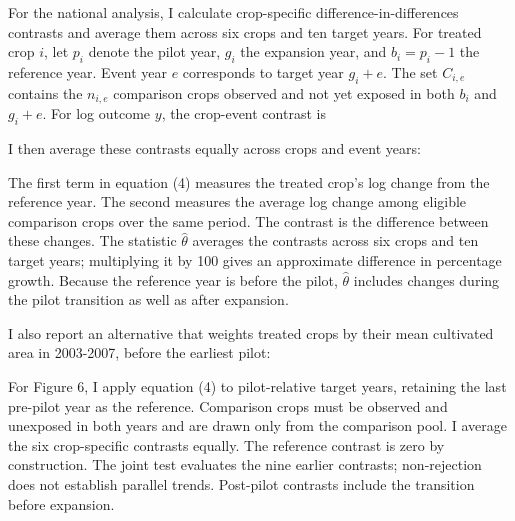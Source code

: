 
For the national analysis, I calculate crop-specific difference-in-differences contrasts and average them across six crops and ten target years. For treated crop \(i\), let \(p_{i}\) denote the pilot year, \(g_{i}\) the expansion year, and \(b_{i} = p_{i} - 1\) the reference year. Event year \(e\) corresponds to target year \(g_{i} + e\). The set \(C_{i,e}\) contains the \(n_{i,e}\) comparison crops observed and not yet exposed in both \(b_{i}\) and \(g_{i} + e\). For log outcome \(y\), the crop-event contrast is


I then average these contrasts equally across crops and event years:


The first term in equation (4) measures the treated crop's log change from the reference year. The second measures the average log change among eligible comparison crops over the same period. The contrast is the difference between these changes. The statistic \(\widehat{\theta}\) averages the contrasts across six crops and ten target years; multiplying it by 100 gives an approximate difference in percentage growth. Because the reference year is before the pilot, \(\widehat{\theta}\) includes changes during the pilot transition as well as after expansion.

I also report an alternative that weights treated crops by their mean cultivated area in 2003-2007, before the earliest pilot:


For Figure 6, I apply equation (4) to pilot-relative target years, retaining the last pre-pilot year as the reference. Comparison crops must be observed and unexposed in both years and are drawn only from the comparison pool. I average the six crop-specific contrasts equally. The reference contrast is zero by construction. The joint test evaluates the nine earlier contrasts; non-rejection does not establish parallel trends. Post-pilot contrasts include the transition before expansion.

